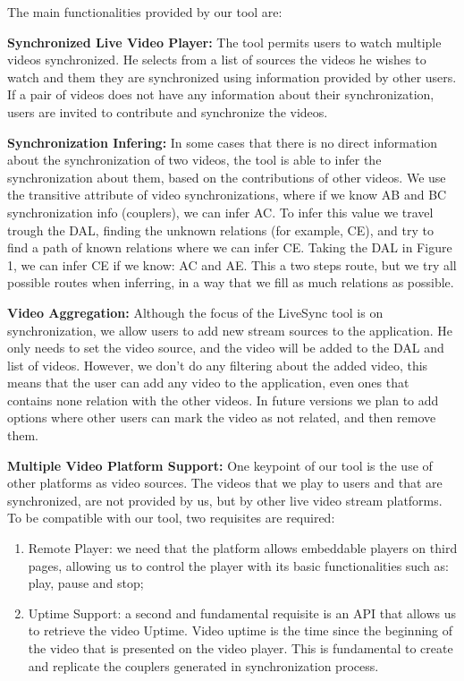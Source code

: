 \label{livesync}
The main functionalities provided by our tool are:

\textbf{Synchronized Live Video Player:} The tool permits users to watch multiple videos synchronized. He selects from a list of sources the videos he wishes to watch and them they are synchronized using information provided by other users. If a pair of videos does not have any information about their synchronization, users are invited to contribute and synchronize the videos.

\textbf{Synchronization Infering:} In some cases that there is no direct information about the synchronization of two videos, the tool is able to infer the synchronization about them, based on the contributions of other videos. We use the transitive attribute of video synchronizations, where if we know AB and BC synchronization info (couplers), we can infer AC. To infer this value we travel trough the DAL, finding the unknown relations (for example, CE), and try to find a path of known relations where we can infer CE. Taking the DAL in Figure 1, we can infer CE if we know: AC and AE. This a two steps route, but we try all possible routes when inferring, in a way that we fill as much relations as possible.

\textbf{Video Aggregation:} Although the focus of the LiveSync tool is on synchronization, we allow users to add new stream sources to the application. He only needs to set the video source, and the video will be added to the DAL and list of videos. However, we don't do any filtering about the added video, this means that the user can add any video to the application, even ones that contains none relation with the other videos. In future versions we plan to add options where other users can mark the video as not related, and then remove them.

\textbf{Multiple Video Platform Support:} One keypoint of our tool is the use of other platforms as video sources. The videos that we play to users and that are synchronized, are not provided by us, but by other live video stream platforms. To be compatible with our tool, two requisites are required:

\begin{enumerate}
	\item Remote Player: we need that the platform allows embeddable players on third pages, allowing us to control the player with its basic functionalities such as: play, pause and stop;
	\item Uptime Support: a second and fundamental requisite is an API that allows us to retrieve the video Uptime. Video uptime is the time since the beginning of the video that is presented on the video player. This is fundamental to create and replicate the couplers generated in synchronization process.
\end{enumerate}

